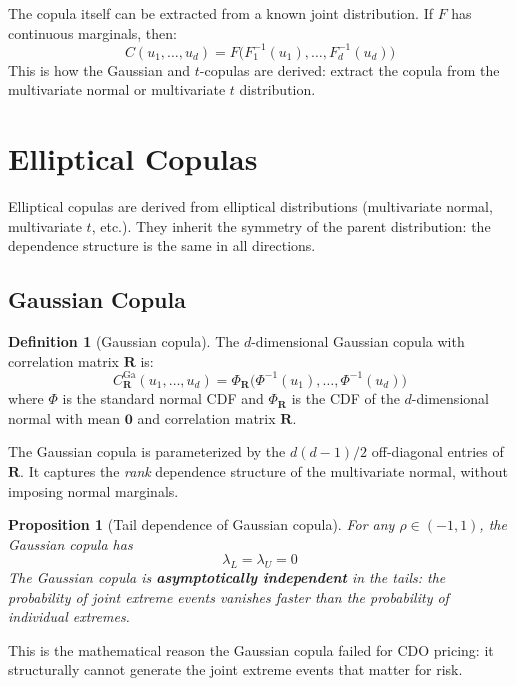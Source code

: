 \documentclass[11pt, a4paper]{article}
\theoremstyle{definition}
\newtheorem{definition}{Definition}[section]
\theoremstyle{plain}
\newtheorem{proposition}{Proposition}[section]
\theoremstyle{remark}
\begin{document}
The copula itself can be extracted from a known joint distribution.
If $F$ has continuous marginals, then:
\[
    C(u_1, \ldots, u_d) = F\bigl(F_1^{-1}(u_1), \ldots, F_d^{-1}(u_d)\bigr)
\]
This is how the Gaussian and $t$-copulas are derived: extract the copula from the multivariate
normal or multivariate $t$ distribution.

\section{Elliptical Copulas}
\label{sec:elliptical}

Elliptical copulas are derived from elliptical distributions (multivariate normal, multivariate $t$, etc.).
They inherit the symmetry of the parent distribution: the dependence structure
is the same in all directions.

\subsection{Gaussian Copula}

\begin{definition}[Gaussian copula]
The $d$-dimensional Gaussian copula with correlation matrix $\bm{R}$ is:
\[
    C_{\bm{R}}^{\text{Ga}}(u_1, \ldots, u_d)
    = \Phi_{\bm{R}}\bigl(\Phi^{-1}(u_1), \ldots, \Phi^{-1}(u_d)\bigr)
\]
where $\Phi$ is the standard normal CDF and $\Phi_{\bm{R}}$ is the CDF of the
$d$-dimensional normal with mean $\bm{0}$ and correlation matrix $\bm{R}$.
\end{definition}

The Gaussian copula is parameterized by the $d(d-1)/2$ off-diagonal entries of $\bm{R}$.
It captures the \emph{rank} dependence structure of the multivariate normal,
without imposing normal marginals.

\begin{proposition}[Tail dependence of Gaussian copula]
For any $\rho \in (-1, 1)$, the Gaussian copula has
\[
    \lambda_L = \lambda_U = 0
\]
The Gaussian copula is \textbf{asymptotically independent} in the tails:
the probability of joint extreme events vanishes faster than the probability of individual extremes.
\end{proposition}

This is the mathematical reason the Gaussian copula failed for CDO pricing:
it structurally cannot generate the joint extreme events that matter for risk.
\end{document}
